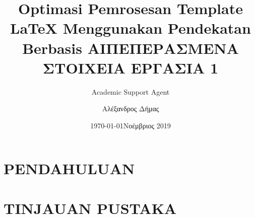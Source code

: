 \documentclass{article}
\title{Optimasi Pemrosesan Template LaTeX Menggunakan Pendekatan Berbasis AI}
\author{Academic Support Agent}
\date{\today}
\begin{document}
\maketitle

\begin{abstract}

\end{abstract}

\chapter{PENDAHULUAN}


\chapter{TINJAUAN PUSTAKA}


\usepackage[LGR, T1]{fontenc}
\usepackage[utf8]{inputenc}
\usepackage[greek]{babel}
\usepackage{alphabeta}
\usepackage{multicol}
\usepackage[margin=0.8in]{geometry}
\usepackage{amsmath}
\usepackage{microtype}
\usepackage{csvsimple}
\usepackage{graphicx}
\graphicspath{ {images/} }
\usepackage{wrapfig}
\usepackage{tabularx}
\usepackage{lscape}

\usepackage{fancyhdr}
\pagestyle{fancy}
\fancyhf{}
\title{ΠΕΠΕΡΑΣΜΕΝΑ ΣΤΟΙΧΕΙΑ ΕΡΓΑΣΙΑ 1}
\author{Αλέξανδρος Δήμας}
\date{Νοέμβριος 2019}
\end{document}
